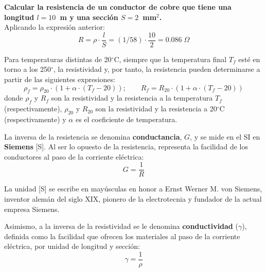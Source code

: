 	\vspace{4mm}
	\begin{example}
          \textbf{Calcular la resistencia de un conductor de cobre que tiene una longitud $l=10$~m y una sección $S=2$~mm$^2$.}\\
          Aplicando la expresión anterior:
          \begin{equation*}
            R=\rho\cdot \dfrac{l}{S}=(1/58)\cdot \dfrac{10}{2}=0.086\;\Omega
          \end{equation*}
	\end{example}
	
	Para temperaturas distintas de 20$^\circ$C, siempre que la
        temperatura final $T_f$ esté en torno a los 250$^\circ$, la
        resistividad y, por tanto, la resistencia pueden determinarse
        a partir de las siguientes expresiones:
	\begin{equation*}
          \rho_f=\rho_{20}\cdot (1+\alpha\cdot (T_f-20)); \qquad
          R_f=R_{20}\cdot (1+\alpha\cdot (T_f-20))
	\end{equation*}
	donde $\rho_f$ y $R_f$ son la resistividad y la resistencia a
        la temperatura $T_f$ (respectivamente), $\rho_{20}$ y $R_{20}$
        son la resistividad y la resistencia a 20$^\circ$C
        (respectivamente) y $\alpha$ es el coeficiente de temperatura.
	
	La inversa de la resistencia se denomina
        \textbf{conductancia}, $G$, y se mide en el SI en
        \textbf{Siemens} [S]. Al ser lo opuesto de la resistencia,
        representa la facilidad de los conductores al paso de la
        corriente eléctrica:
	\begin{equation}
          \boxed{G=\dfrac{1}{R}}
	\end{equation}
	\begin{remark}
          La unidad [S] se escribe en mayúsculas en honor a Ernst
          Werner M. von Siemens, inventor alemán del siglo XIX,
          pionero de la electrotecnia y fundador de la actual empresa
          Siemens.
	\end{remark}
	Asimismo, a la inversa de la resistividad se le denomina
        \textbf{conductividad} ($\gamma$), definida como la facilidad
        que ofrecen los materiales al paso de la corriente eléctrica,
        por unidad de longitud y sección:
	\begin{equation*}
          \gamma=\dfrac{1}{\rho}
	\end{equation*}
	
